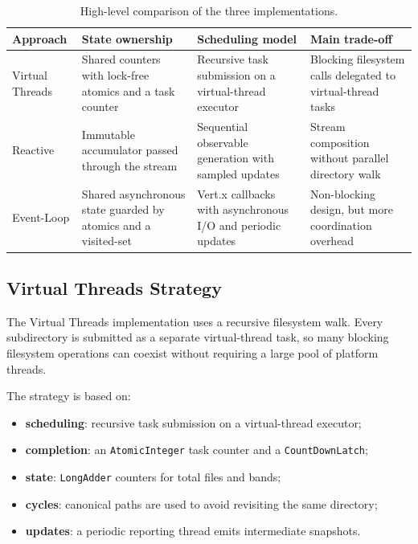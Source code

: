 \begin{table}[h]
\centering
\renewcommand{\arraystretch}{1.2}
\begin{tabular}{>{\raggedright\arraybackslash}p{2.7cm} >{\raggedright\arraybackslash}p{3.8cm} >{\raggedright\arraybackslash}p{3.8cm} >{\raggedright\arraybackslash}p{3.8cm}}
\toprule
\textbf{Approach} & \textbf{State ownership} & \textbf{Scheduling model} & \textbf{Main trade-off} \\
\midrule
Virtual Threads & Shared counters with lock-free atomics and a task counter & Recursive task submission on a virtual-thread executor & Blocking filesystem calls delegated to virtual-thread tasks \\
Reactive & Immutable accumulator passed through the stream & Sequential observable generation with sampled updates & Stream composition without parallel directory walk \\
Event-Loop & Shared asynchronous state guarded by atomics and a visited-set & Vert.x callbacks with asynchronous I/O and periodic updates & Non-blocking design, but more coordination overhead \\
\bottomrule
\end{tabular}
\caption{High-level comparison of the three implementations.}
\end{table}

\subsection{Virtual Threads Strategy}

The Virtual Threads implementation uses a recursive filesystem walk. Every
subdirectory is submitted as a separate virtual-thread task, so many blocking
filesystem operations can coexist without requiring a large pool of platform
threads.

The strategy is based on:

\begin{itemize}
  \item \textbf{scheduling}: recursive task submission on a virtual-thread
  executor;
  \item \textbf{completion}: an \texttt{AtomicInteger} task counter and a
  \texttt{CountDownLatch};
  \item \textbf{state}: \texttt{LongAdder} counters for total files and bands;
  \item \textbf{cycles}: canonical paths are used to avoid revisiting the same
  directory;
  \item \textbf{updates}: a periodic reporting thread emits intermediate
  snapshots.
\end{itemize}

